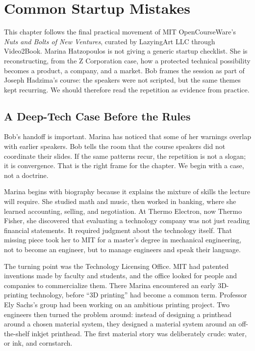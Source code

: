 \chapter{Common Startup Mistakes}

This chapter follows the final practical movement of MIT OpenCourseWare's \emph{Nuts and Bolts of New Ventures}, curated by LazyingArt LLC through Video2Book. Marina Hatzopoulos is not giving a generic startup checklist. She is reconstructing, from the Z Corporation case, how a protected technical possibility becomes a product, a company, and a market. Bob frames the session as part of Joseph Hadzima's course: the speakers were not scripted, but the same themes kept recurring. We should therefore read the repetition as evidence from practice.

\section{A Deep-Tech Case Before the Rules}

Bob's handoff is important. Marina has noticed that some of her warnings overlap with earlier speakers. Bob tells the room that the course speakers did not coordinate their slides. If the same patterns recur, the repetition is not a slogan; it is convergence. That is the right frame for the chapter. We begin with a case, not a doctrine.

Marina begins with biography because it explains the mixture of skills the lecture will require. She studied math and music, then worked in banking, where she learned accounting, selling, and negotiation. At Thermo Electron, now Thermo Fisher, she discovered that evaluating a technology company was not just reading financial statements. It required judgment about the technology itself. That missing piece took her to MIT for a master's degree in mechanical engineering, not to become an engineer, but to manage engineers and speak their language.

The turning point was the Technology Licensing Office. MIT had patented inventions made by faculty and students, and the office looked for people and companies to commercialize them. There Marina encountered an early 3D-printing technology, before ``3D printing'' had become a common term. Professor Ely Sachs's group had been working on an ambitious printing project. Two engineers then turned the problem around: instead of designing a printhead around a chosen material system, they designed a material system around an off-the-shelf inkjet printhead. The first material story was deliberately crude: water, or ink, and cornstarch.

